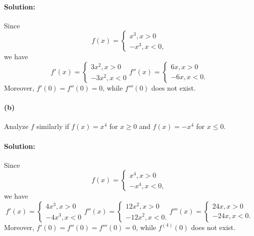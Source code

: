 \documentclass{article}
\begin{document}
\paragraph{Solution:} Since \begin{equation*}
  f(x) = \begin{cases}
    x^3, x > 0 \\
    -x^3, x < 0,
  \end{cases}
\end{equation*} we have \begin{equation*}
  f'(x) = \begin{cases}
    3x^2, x > 0 \\
    -3x^2, x < 0
  \end{cases}
  f''(x) = \begin{cases}
    6x, x > 0 \\
    -6x, x < 0.
  \end{cases}
\end{equation*}
Moreover, $f'(0) = f''(0) = 0$, while $f'''(0)$ does not exist.

\paragraph{(b)} Analyze $f$ similarly if $f(x) = x^4$ for $x \geq 0$ and $f(x)
= -x^4$ for $x \leq 0$.

\paragraph{Solution:} Since \begin{equation*}
  f(x) = \begin{cases}
    x^4, x > 0 \\
    -x^4, x < 0,
  \end{cases}
\end{equation*} we have \begin{equation*}
  f'(x) = \begin{cases}
    4x^3, x > 0 \\
    -4x^3, x < 0
  \end{cases}
  f''(x) = \begin{cases}
    12x^2, x > 0 \\
    -12x^2, x < 0.
  \end{cases}
  f'''(x) = \begin{cases}
    24x, x > 0 \\
    -24x, x < 0.
  \end{cases}
\end{equation*}
Moreover, $f'(0) = f''(0) = f'''(0) = 0$, while $f^{(4)}(0)$ does not exist.
\end{document}
